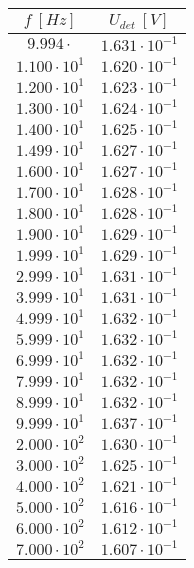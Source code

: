 
\begin{tabular}{|c|c|}
    \hline
    \(f~[Hz]\)  	   & \(U_{det}~[V]\)	       \\ \hline    
    \(9.994\cdot    \) & \(1.631\cdot10^{-1}\) \\ \hline    
    \(1.100\cdot10^1\) & \(1.620\cdot10^{-1}\) \\ \hline    
    \(1.200\cdot10^1\) & \(1.623\cdot10^{-1}\) \\ \hline    
    \(1.300\cdot10^1\) & \(1.624\cdot10^{-1}\) \\ \hline    
    \(1.400\cdot10^1\) & \(1.625\cdot10^{-1}\) \\ \hline    
    \(1.499\cdot10^1\) & \(1.627\cdot10^{-1}\) \\ \hline    
    \(1.600\cdot10^1\) & \(1.627\cdot10^{-1}\) \\ \hline    
    \(1.700\cdot10^1\) & \(1.628\cdot10^{-1}\) \\ \hline    
    \(1.800\cdot10^1\) & \(1.628\cdot10^{-1}\) \\ \hline    
    \(1.900\cdot10^1\) & \(1.629\cdot10^{-1}\) \\ \hline    
    \(1.999\cdot10^1\) & \(1.629\cdot10^{-1}\) \\ \hline    
    \(2.999\cdot10^1\) & \(1.631\cdot10^{-1}\) \\ \hline    
    \(3.999\cdot10^1\) & \(1.631\cdot10^{-1}\) \\ \hline    
    \(4.999\cdot10^1\) & \(1.632\cdot10^{-1}\) \\ \hline    
    \(5.999\cdot10^1\) & \(1.632\cdot10^{-1}\) \\ \hline    
    \(6.999\cdot10^1\) & \(1.632\cdot10^{-1}\) \\ \hline    
    \(7.999\cdot10^1\) & \(1.632\cdot10^{-1}\) \\ \hline    
    \(8.999\cdot10^1\) & \(1.632\cdot10^{-1}\) \\ \hline    
    \(9.999\cdot10^1\) & \(1.637\cdot10^{-1}\) \\ \hline    
    \(2.000\cdot10^2\) & \(1.630\cdot10^{-1}\) \\ \hline    
    \(3.000\cdot10^2\) & \(1.625\cdot10^{-1}\) \\ \hline    
    \(4.000\cdot10^2\) & \(1.621\cdot10^{-1}\) \\ \hline    
    \(5.000\cdot10^2\) & \(1.616\cdot10^{-1}\) \\ \hline    
    \(6.000\cdot10^2\) & \(1.612\cdot10^{-1}\) \\ \hline    
    \(7.000\cdot10^2\) & \(1.607\cdot10^{-1}\) \\ \hline    

\end{tabular}
